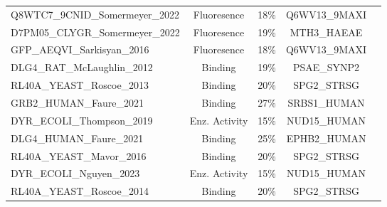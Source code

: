 \documentclass[11pt]{article}
\begin{document}
\begin{table}[htbp]
{\begin{tabular}{lcccr}
Q8WTC7\_9CNID\_Somermeyer\_2022 & Fluoresence &18\%&Q6WV13\_9MAXI\\
D7PM05\_CLYGR\_Somermeyer\_2022 & Fluoresence&19\%&MTH3\_HAEAE\\
GFP\_AEQVI\_Sarkisyan\_2016 & Fluoresence&18\%&Q6WV13\_9MAXI\\
DLG4\_RAT\_McLaughlin\_2012 & Binding&19\%& PSAE\_SYNP2\\
RL40A\_YEAST\_Roscoe\_2013 & Binding&20\%&SPG2\_STRSG\\
GRB2\_HUMAN\_Faure\_2021 & Binding&27\%& SRBS1\_HUMAN\\
DYR\_ECOLI\_Thompson\_2019& Enz. Activity&15\%&NUD15\_HUMAN\\
DLG4\_HUMAN\_Faure\_2021 & Binding &25\%& EPHB2\_HUMAN\\
RL40A\_YEAST\_Mavor\_2016 & Binding&20\%&SPG2\_STRSG\\
DYR\_ECOLI\_Nguyen\_2023& Enz. Activity&15\%&NUD15\_HUMAN \\
RL40A\_YEAST\_Roscoe\_2014& Binding&20\%&SPG2\_STRSG\\

\bottomrule
\end{tabular}
}
\end{table}
\end{document}
